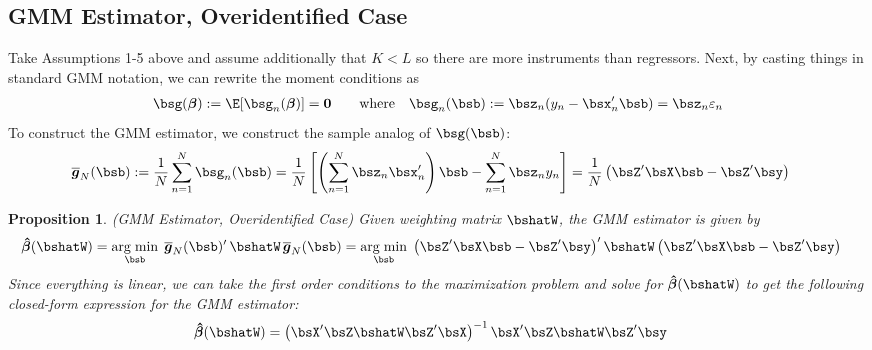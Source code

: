 \documentclass[12pt]{article}
\theoremstyle{plain}
\newtheorem{prop}[thm]{Proposition}
\theoremstyle{definition}
\theoremstyle{remark}
\newcommand{\bsbeta}{\boldsymbol{\beta}}
\newcommand{\bshatbeta}{\boldsymbol{\hat{\beta}}}
\newcommand{\bsbarg}{\boldsymbol{\overline{g}}}
\renewcommand{\bso}{\boldsymbol{0}}
\DeclareMathOperator*{\argmin}{arg\;min}
\newcommand{\sumnN}{\sum^N_{n=1}}
\begin{document}
\clearpage
\subsection{GMM Estimator, Overidentified Case}
\label{subsec:EndogenousRegressorGMM}

Take Assumptions 1-5 above and assume additionally that $K<L$ so there
are more instruments than regressors.
Next, by casting things in standard GMM notation, we can rewrite the
moment conditions as
\begin{align*}
  \bsg(\bsbeta) :=
  \E[\bsg_n(\bsbeta)]=\bso
  \qquad\text{where}\quad
  \bsg_n(\bsb) :=
  \bsz_n(y_n-\bsx_n'\bsb)
  = \bsz_n\varepsilon_n
\end{align*}
To construct the GMM estimator, we construct the sample analog of
$\bsg(\bsb)$:
\begin{align*}
  \bsbarg_N(\bsb)
  :=&\; \frac{1}{N}\sumnN \bsg_n(\bsb)
  =
  \frac{1}{N}\left[
  \left(\sumnN \bsz_n\bsx'_n \right)\bsb
  - \sumnN \bsz_n y_n
  \right]
  =
  \frac{1}{N}\left(\bsZ'\bsX\bsb - \bsZ'\bsy\right)
\end{align*}

\begin{prop}\emph{(GMM Estimator, Overidentified Case)}
Given weighting matrix $\bshatW$, the GMM estimator is given by
\begin{align*}
  \bshatbeta(\bshatW)
  &= \argmin_{\bsb} \; \bsbarg_N(\bsb)' \, \bshatW \, \bsbarg_N(\bsb)
  = \argmin_{\bsb} \;
    \left(\bsZ'\bsX\bsb - \bsZ'\bsy\right)'
    \bshatW
    \left(\bsZ'\bsX\bsb - \bsZ'\bsy\right)
\end{align*}
Since everything is linear, we can take the first order conditions to
the maximization problem and solve for $\bshatbeta(\bshatW)$ to get the
following closed-form expression for the GMM estimator:
\begin{align}
  \bshatbeta(\bshatW) &=
  \left(\bsX'\bsZ\bshatW \bsZ'\bsX\right)^{-1}\bsX'\bsZ\bshatW\bsZ'\bsy
  \label{sendog:gmm}
\end{align}
\end{prop}
\end{document}
